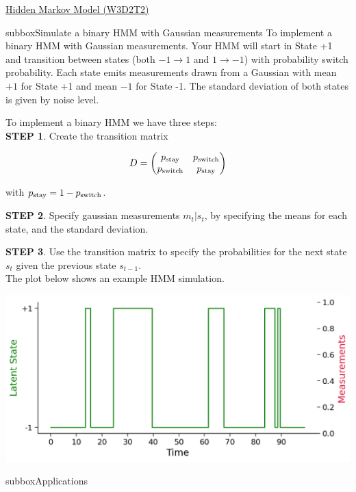 \begin{textbox}{\href{http://instructor.compneuro.neuromatch.io/tutorials/W3D2_HiddenDynamics/instructor/W3D2_Tutorial2.html}{Hidden Markov Model (W3D2T2)}   }

\begin{subbox}{subbox}{Simulate a binary HMM with Gaussian measurements}
\scriptsize
To implement a binary HMM with Gaussian measurements. Your HMM will start in State +1 and transition between states (both $-1 \rightarrow 1$ and $1 \rightarrow -1$) with probability switch probability. Each state emits measurements drawn from a Gaussian with mean $+1$ for State +1 and mean $-1$ for State -1. The standard deviation of both states is given by noise level.

To implement a binary HMM we have three steps:\\
\textbf{STEP 1}. Create the transition matrix  

\begin{equation}
D = 
\begin{pmatrix}
p_{\rm stay} & p_{\rm switch} \\
p_{\rm switch} & p_{\rm stay} \\
\end{pmatrix}
\end{equation}

with $p_{\rm stay} = 1 - p_{\rm switch}$. 

\textbf{STEP 2}. Specify gaussian measurements $m_t | s_t$, by specifying the means for each state, and the standard deviation.

\textbf{STEP 3}. Use the transition matrix to specify the probabilities for the next state $s_t$ given the previous state $s_{t-1}$.\\

The plot below shows an example HMM simulation. 
\begin{center}
    
\includegraphics[scale=0.25]{Figures/HD/HD_Figure3.png}
\end{center}
\end{subbox}
\begin{subbox}{subbox}{Applications}
\scriptsize


\end{subbox}
\end{textbox}
